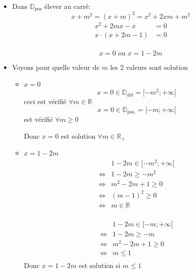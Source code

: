 \documentclass[
    11pt,
    a4paper,
    oneside,
    headinlcude, footinclude,
    twoside,
]{report}
\begin{document}
\begin{enumerate}
\begin{itemize}
        \item Dans $\mathbb{D}_{\text{pos}}$ élever au carré:
            $$ x + m^{2} = (x + m)^{2} = x^{2} + 2xm + m^{2}$$
            \[
                \begin{split}
                    x^{2} + 2mx - x &=0\\
                    x\cdot (x +2m -1) &=0\\
                \end{split}
            \]

            $$x = 0 \text{ ou } x = 1-2m$$

        \item Voyons pour quelle valeur de $m$ les 2 valeurs sont solution
            \begin{itemize}
                \item $x = 0$ $$x = 0 \in \mathbb{D}_{\text{déf}} = [-m^{2}; +
                    \infty[$$
                    ceci est vérifié $\forall m \in \mathbb{R}$
                    $$x = 0 \in \mathbb{D}_{\text{pos.}} = [-m ; + \infty[$$
                    est vérifié $\forall m \geq 0$

                    Donc $x = 0$ est solution $\forall m \in \mathbb{R}_{+}$

                \item $x = 1 - 2m$ 
                    \[
                        \begin{split}
                            &1 - 2m \in [-m^{2}; + \infty[\\
                            \iff & 1 - 2 m \geq - m^{2}\\
                            \iff & m^{2} -2m + 1 \geq 0\\
                            \iff & (m-1) ^{2} \geq 0\\
                            \iff & m \in \mathbb{R}\\
                        \end{split}
                    \]

                    \[
                        \begin{split}
                            &1 - 2m \in [-m; + \infty[\\
                            \iff & 1 - 2 m \geq - m\\
                            \iff & m^{2} -2m + 1 \geq 0\\
                            \iff & m \leq 1\\
                        \end{split}
                    \]
                    Donc $x = 1 - 2m$ est solution si $m \leq 1$


\end{itemize}
\end{itemize}
\end{enumerate}
\end{document}
